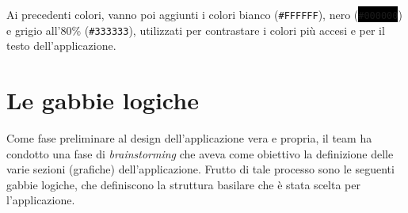 Ai precedenti colori, vanno poi aggiunti i colori bianco (\colorbox[HTML]{FFFFFF}{\texttt{\#FFFFFF}}), nero (\colorbox{black}{\color{white}\texttt{\#000000}}) e grigio all'80\% (\colorbox[HTML]{333333}{\color{white}\texttt{\#333333}}), utilizzati per contrastare i colori più accesi e per il testo dell'applicazione.

\section{Le gabbie logiche}

Come fase preliminare al design dell'applicazione vera e propria, il team ha condotto una fase di \emph{brainstorming} che aveva come obiettivo la definizione delle varie sezioni (grafiche) dell'applicazione. Frutto di tale processo sono le seguenti gabbie logiche, che definiscono la struttura basilare che è stata scelta per l'applicazione.

